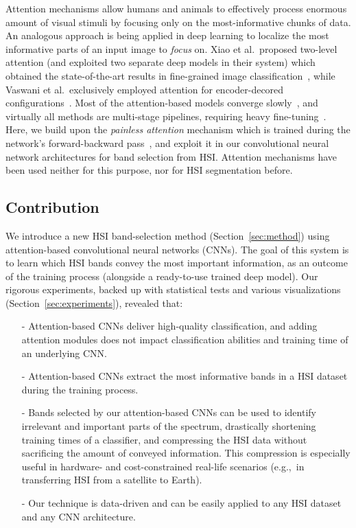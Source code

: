 \documentclass[journal]{IEEEtran}
\begin{document}
Attention mechanisms allow humans and animals to effectively process enormous amount of visual stimuli by focusing only on the most-informative chunks of data. An analogous approach is being applied in deep learning to localize the most informative parts of an input image to \emph{focus} on. Xiao et al.~proposed two-level attention (and exploited two separate deep models in their system) which obtained the state-of-the-art results in fine-grained image classification~\cite{DBLP:journals/corr/XiaoXYZPZ14}, while Vaswani et al.~exclusively employed attention for encoder-decored configurations~\cite{NIPS2017_7181}. Most of the attention-based models converge slowly~\cite{DBLP:journals/corr/LiuXWL16}, and virtually all methods are multi-stage pipelines, requiring heavy fine-tuning~\cite{8099959,7807286}. Here, we build upon the \textit{painless attention} mechanism which is trained during the network's forward-backward pass~\cite{painlessattention}, and exploit it in our convolutional neural network architectures for band selection from HSI. Attention mechanisms have been used neither for this purpose, nor for HSI segmentation before.

\subsection{Contribution}

We introduce a new HSI band-selection method (Section~\ref{sec:method}) using attention-based convolutional neural networks (CNNs). The goal of this system is to learn which HSI bands convey the most important information, as an outcome of the training process (alongside a ready-to-use trained deep model). Our rigorous experiments, backed up with statistical tests and various visualizations (Section~\ref{sec:experiments}), revealed that:

\begin{itemize}
\item[-] Attention-based CNNs deliver high-quality classification, and adding attention modules does not impact classification abilities and training time of an underlying CNN.
\item[-] Attention-based CNNs extract the most informative bands in a HSI dataset during the training process.
\item[-] Bands selected by our attention-based CNNs can be used to identify irrelevant and important parts of the spectrum, drastically shortening training times of a classifier, and compressing the HSI data without sacrificing the amount of conveyed information. This compression is especially useful in hardware- and cost-constrained real-life scenarios (e.g.,~in transferring HSI from a satellite to Earth).
\item[-] Our technique is data-driven and can be easily applied to any HSI dataset and any CNN architecture.
\end{itemize}
\end{document}
